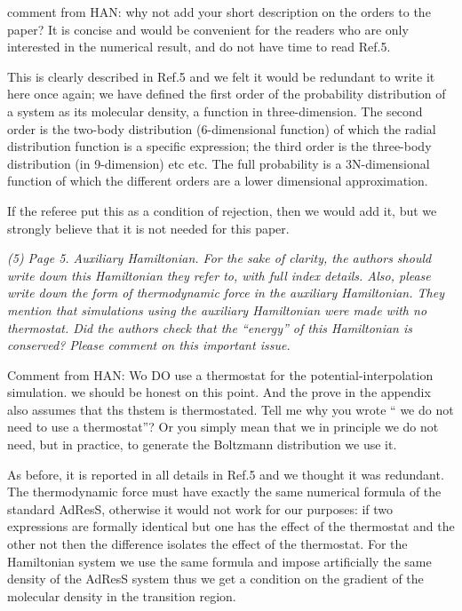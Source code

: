 \documentclass[12pt]{article}
\newcommand{\recheck}[1]{{\color{red} #1}}
\begin{document}
\recheck{comment from HAN: why not add your short description on the
  orders to the paper? It is concise and would be convenient for the
  readers who are only interested in the numerical result, and do not
  have time to read Ref.5.}
  
This is clearly described in Ref.5 and we felt it would be redundant
to write it here once again; we have defined the first order of the
probability distribution of a system as its molecular density, a
function in three-dimension. The second order is the two-body
distribution (6-dimensional function) of which the radial distribution
function is a specific expression; the third order is the three-body
distribution (in 9-dimension) etc etc. The full probability is a
3N-dimensional function of which the different orders are a lower
dimensional approximation.

If the referee put this as a condition of rejection, then we would add
it, but we strongly believe that it is not needed for this paper.

{\it (5) Page 5. Auxiliary Hamiltonian. For the sake of clarity, the
  authors should write down this Hamiltonian they refer to, with full
  index details. Also, please write down the form of thermodynamic
  force in the auxiliary Hamiltonian. They mention that simulations
  using the auxiliary Hamiltonian were made with no thermostat. Did
  the authors check that the ``energy'' of this Hamiltonian is
  conserved? Please comment on this important issue.}

\recheck{Comment from HAN: Wo DO use a thermostat for the potential-interpolation
  simulation.  we should be honest on this point. And the prove in the
  appendix also assumes that ths thstem is thermostated. Tell me why you wrote ``
  we do not need to use a thermostat''? Or you simply mean that we in principle we
  do not need, but in practice, to generate the Boltzmann distribution we use it.}
  
  As before, it is reported in all details in Ref.5 and we thought it
  was redundant. The thermodynamic force must have exactly the same
  numerical formula of the standard AdResS, otherwise it would not
  work for our purposes: if two expressions are formally identical but
  one has the effect of the thermostat and the other not then the
  difference isolates the effect of the thermostat. For the
  Hamiltonian system we use the same formula and impose artificially
  the same density of the AdResS system thus we get a condition on the
  gradient of the molecular density in the transition region.
  
\end{document}
